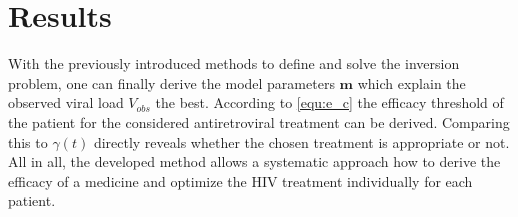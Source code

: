 \section{Results}
\label{sec:results}

With the previously introduced methods to define and solve the inversion problem, one can finally derive the model parameters $\mathbf{m}$ which explain the observed viral load $V_{obs}$ the best.
According to \ref{equ:e_c} the efficacy threshold of the patient for the considered antiretroviral treatment can be derived.
Comparing this to $\gamma(t)$ directly reveals whether the chosen treatment is appropriate or not.\\
All in all, the developed method allows a systematic approach how to derive the efficacy of a medicine and optimize the HIV treatment individually for each patient.
